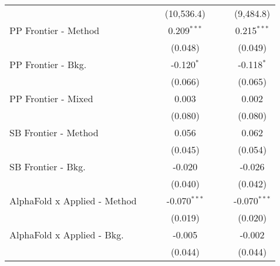 \begin{tabular}{lcccccc}
                                  &                &                & (10,536.4)     &                &                & (9,484.8)\\   
   PP Frontier - Method           &                &                & 0.209$^{***}$  &                &                & 0.215$^{***}$\\   
                                  &                &                & (0.048)        &                &                & (0.049)\\   
   PP Frontier - Bkg.             &                &                & -0.120$^{*}$   &                &                & -0.118$^{*}$\\   
                                  &                &                & (0.066)        &                &                & (0.065)\\   
   PP Frontier - Mixed            &                &                & 0.003          &                &                & 0.002\\   
                                  &                &                & (0.080)        &                &                & (0.080)\\   
   SB Frontier - Method           &                &                & 0.056          &                &                & 0.062\\   
                                  &                &                & (0.045)        &                &                & (0.054)\\   
   SB Frontier - Bkg.             &                &                & -0.020         &                &                & -0.026\\   
                                  &                &                & (0.040)        &                &                & (0.042)\\   
   AlphaFold x Applied - Method   &                &                & -0.070$^{***}$ &                &                & -0.070$^{***}$\\   
                                  &                &                & (0.019)        &                &                & (0.020)\\   
   AlphaFold x Applied - Bkg.     &                &                & -0.005         &                &                & -0.002\\   
                                  &                &                & (0.044)        &                &                & (0.044)\\   

\end{tabular}
